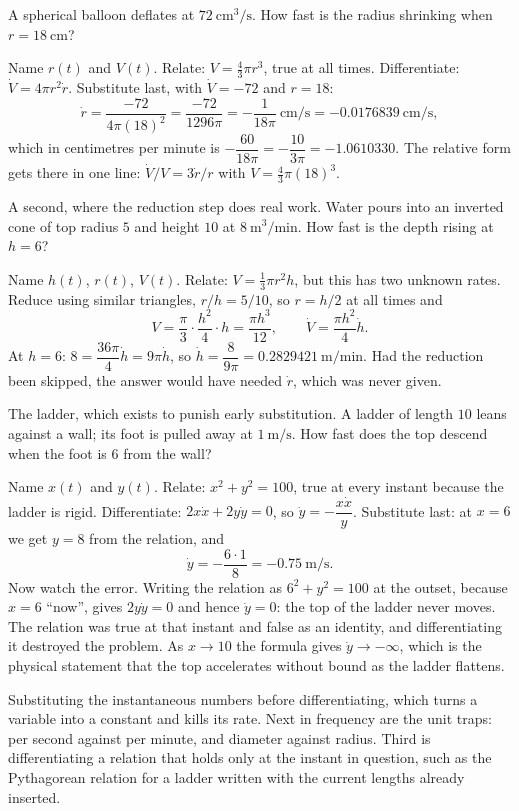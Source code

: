 \begin{worked}
A spherical balloon deflates at $72\ \mathrm{cm^{3}/s}$. How fast is the radius shrinking when $r=18\ \mathrm{cm}$?

Name $r(t)$ and $V(t)$. Relate: $V=\tfrac43\pi r^{3}$, true at all times. Differentiate: $\dot V=4\pi r^{2}\dot r$. Substitute last, with $\dot V=-72$ and $r=18$:
\[
\dot r=\frac{-72}{4\pi(18)^{2}}=\frac{-72}{1296\pi}=-\frac{1}{18\pi}\ \mathrm{cm/s}=-0.0176839\ \mathrm{cm/s},
\]
which in centimetres per minute is $-\dfrac{60}{18\pi}=-\dfrac{10}{3\pi}=-1.0610330$. The relative form gets there in one line: $\dot V/V=3\dot r/r$ with $V=\tfrac43\pi(18)^{3}$.

A second, where the reduction step does real work. Water pours into an inverted cone of top radius $5$ and height $10$ at $8\ \mathrm{m^{3}/min}$. How fast is the depth rising at $h=6$?

Name $h(t)$, $r(t)$, $V(t)$. Relate: $V=\tfrac13\pi r^{2}h$, but this has two unknown rates. Reduce using similar triangles, $r/h=5/10$, so $r=h/2$ at all times and
\[
V=\frac{\pi}{3}\cdot\frac{h^{2}}{4}\cdot h=\frac{\pi h^{3}}{12},\qquad \dot V=\frac{\pi h^{2}}{4}\dot h .
\]
At $h=6$: $8=\dfrac{36\pi}{4}\dot h=9\pi\dot h$, so $\dot h=\dfrac{8}{9\pi}=0.2829421\ \mathrm{m/min}$. Had the reduction been skipped, the answer would have needed $\dot r$, which was never given.

The ladder, which exists to punish early substitution. A ladder of length $10$ leans against a wall; its foot is pulled away at $1\ \mathrm{m/s}$. How fast does the top descend when the foot is $6$ from the wall?

Name $x(t)$ and $y(t)$. Relate: $x^{2}+y^{2}=100$, true at every instant because the ladder is rigid. Differentiate: $2x\dot x+2y\dot y=0$, so $\dot y=-\dfrac{x\dot x}{y}$. Substitute last: at $x=6$ we get $y=8$ from the relation, and
\[
\dot y=-\frac{6\cdot1}{8}=-0.75\ \mathrm{m/s} .
\]
Now watch the error. Writing the relation as $6^{2}+y^{2}=100$ at the outset, because $x=6$ ``now'', gives $2y\dot y=0$ and hence $\dot y=0$: the top of the ladder never moves. The relation was true at that instant and false as an identity, and differentiating it destroyed the problem. As $x\to10$ the formula gives $\dot y\to-\infty$, which is the physical statement that the top accelerates without bound as the ladder flattens.
\end{worked}

\begin{trap}
Substituting the instantaneous numbers before differentiating, which turns a variable into a constant and kills its rate. Next in frequency are the unit traps: per second against per minute, and diameter against radius. Third is differentiating a relation that holds only at the instant in question, such as the Pythagorean relation for a ladder written with the current lengths already inserted.
\end{trap}

